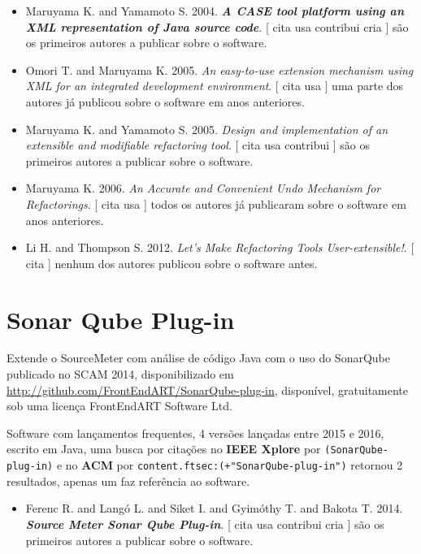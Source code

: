 \begin{itemize}
\item Maruyama K. and Yamamoto S.
      2004.
        \textbf{\textit{ A CASE tool platform using an XML representation of Java source code}}.
      [
          cita
          usa
          contribui
          cria
      ]
são os primeiros autores a publicar sobre o software.
\item Omori T. and Maruyama K.
      2005.
        \textit{ An easy-to-use extension mechanism using XML for an integrated development environment}.
      [
          cita
          usa
      ]
uma parte dos autores já publicou sobre o software em anos anteriores.
\item Maruyama K. and Yamamoto S.
      2005.
        \textit{ Design and implementation of an extensible and modifiable refactoring tool}.
      [
          cita
          usa
          contribui
      ]
são os primeiros autores a publicar sobre o software.
\item Maruyama K.
      2006.
        \textit{ An Accurate and Convenient Undo Mechanism for Refactorings}.
      [
          cita
          usa
      ]
todos os autores já publicaram sobre o software em anos anteriores.
\item Li H. and Thompson S.
      2012.
        \textit{ Let's Make Refactoring Tools User-extensible!}.
      [
          cita
      ]
nenhum dos autores publicou sobre o software antes.
\end{itemize}
\section{Sonar Qube Plug-in}

Extende o SourceMeter com análise de código Java com o uso do SonarQube
publicado no SCAM 2014,
disponibilizado em \url{http://github.com/FrontEndART/SonarQube-plug-in},
disponível,
gratuitamente
sob uma licença FrontEndART Software Ltd.

Software com lançamentos frequentes,
4 versões lançadas
entre 2015 e 2016,
escrito em Java,
uma busca por citações no {\bf IEEE Xplore} por
\texttt{(SonarQube-plug-in)}
e no {\bf ACM} por
\texttt{content.ftsec:(+"SonarQube-plug-in")}
retornou
2 resultados,
apenas um faz referência ao software.

\begin{itemize}
\item Ferenc R. and Langó L. and Siket I. and Gyimóthy T. and Bakota T.
      2014.
        \textbf{\textit{ Source Meter Sonar Qube Plug-in}}.
      [
          cita
          usa
          contribui
          cria
      ]
são os primeiros autores a publicar sobre o software.
\end{itemize}
